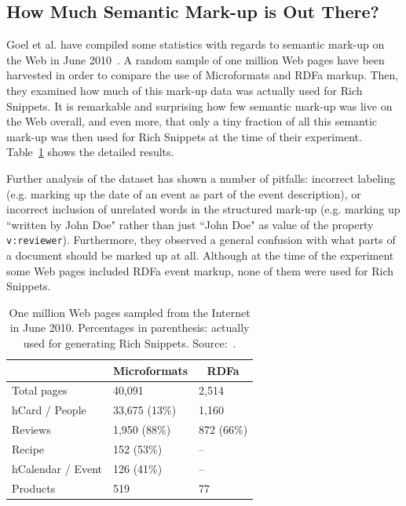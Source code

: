 \documentclass[12pt]{article}
\begin{document}
\subsection{How Much Semantic Mark-up is Out There?}                         \label{sec:how-much-markup}
Goel et al. have compiled some statistics with regards to semantic mark-up on the Web in June 2010~\cite{Goel:SemTech10}. A random sample of one million Web pages have been harvested in order to compare the use of Microformats and RDFa markup. Then, they examined how much of this mark-up data was actually used for Rich Snippets. It is remarkable and surprising how few semantic mark-up was live on the Web overall, and even more, that only a tiny fraction of all this semantic mark-up was then used for Rich Snippets at the time of their experiment. Table~\ref{tab:google-stats} shows the detailed results.

Further analysis of the dataset has shown a number of pitfalls: incorrect labeling (e.g. marking up the date of an event as part of the event description), or incorrect inclusion of unrelated words in the structured mark-up (e.g. marking up ``written by John Doe" rather than just ``John Doe" as value of the property \texttt{v:reviewer}). Furthermore, they observed a general confusion with what parts of a document should be marked up at all. Although at the time of the experiment some Web pages included RDFa event markup, none of them were used for Rich Snippets.

\begin{table}[htbp]
 \begin{center}
  \begin{tabular}{|l|l|l|}
  \multicolumn{1}{c}{\textbf{}} & \multicolumn{1}{|c}{\textbf{Microformats}} & \multicolumn{1}{|c|}{\textbf{RDFa}} \\
  \hline
  Total pages & 40,091 & 2,514 \\
  \hline
  hCard / People & 33,675 (13\%) & 1,160 \\
  \hline
  Reviews & 1,950 (88\%) & 872 (66\%) \\
  \hline
  Recipe & 152 (53\%) & -- \\
  \hline
  hCalendar / Event & 126 (41\%) & -- \\
  \hline
  Products & 519 & 77 \\
  \hline
  \end{tabular}
  \caption[One million Web pages sampled from the Internet in June 2010.]{One million Web pages sampled from the Internet in June 2010. Percentages in parenthesis: actually used for generating Rich Snippets. Source:~\cite{Goel:SemTech10}.}
  \label{tab:google-stats}
 \end{center}
\end{table}
\end{document}
